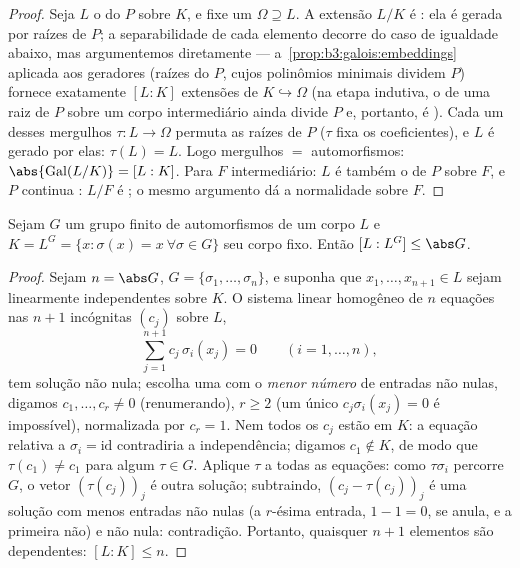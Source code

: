 \begin{proof}
Seja $L$ o  do  $P$
sobre $K$, e fixe um  $\Omega \supseteq L$. A extensão $L/K$ é
: ela é gerada por raízes de $P$; a separabilidade de cada
elemento decorre do caso de igualdade abaixo, mas argumentemos
diretamente --- a~\cref{prop:b3:galois:embeddings} aplicada aos geradores (raízes do
 $P$, cujos polinômios minimais dividem $P$)
fornece exatamente $[L:K]$ extensões de $K \hookrightarrow \Omega$ (na etapa indutiva, o
 de uma raiz de $P$ sobre um corpo intermediário
ainda divide $P$ e, portanto, é ). Cada um desses
mergulhos $\tau \colon L \to \Omega$ permuta as raízes de $P$ ($\tau$ fixa os
coeficientes), e $L$ é gerado por elas: $\tau(L) = L$. Logo mergulhos
$=$ automorfismos: $\abs{\operatorname{Gal}(L/K)} = [L:K]$. Para $F$ intermediário: $L$ é
também o  de $P$ sobre $F$, e $P$
continua : $L/F$ é ; o mesmo argumento dá a
normalidade sobre $F$.
\end{proof}

\begin{lemma}[Artin]\label{lem:b3:galois:artin}
Sejam $G$ um grupo finito de automorfismos de um corpo $L$ e
$K = L^G = \{x : \sigma(x) = x\ \forall\sigma \in G\}$ seu corpo fixo. Então $[L : L^G] \leq \abs G$.
\end{lemma}

\begin{proof}
Sejam $n = \abs G$, $G = \{\sigma_1, \dots, \sigma_n\}$, e suponha que $x_1, \dots, x_{n+1} \in L$ sejam linearmente
independentes sobre $K$. O sistema linear homogêneo de $n$
equações nas $n+1$ incógnitas $(c_j)$ sobre $L$,
\[
\sum_{j=1}^{n+1} c_j\,\sigma_i(x_j) = 0
\qquad (i = 1, \dots, n),
\]
tem solução não nula; escolha uma com o \emph{menor número} de entradas
não nulas, digamos $c_1, \dots, c_r \neq 0$ (renumerando), $r \geq 2$ (um único $c_j\sigma_i(x_j) = 0$ é
impossível), normalizada por $c_r = 1$. Nem todos os $c_j$ estão em
$K$: a equação relativa a $\sigma_i =
\mathrm{id}$ contradiria a independência;
digamos $c_1 \notin K$, de modo que $\tau(c_1) \ne c_1$ para algum $\tau \in G$. Aplique $\tau$ a
todas as equações: como $\tau\sigma_i$ percorre $G$, o vetor $(\tau(c_j))_j$ é outra
solução; subtraindo, $(c_j -
\tau(c_j))_j$ é uma solução com menos entradas não nulas
(a $r$-ésima entrada, $1 - 1 = 0$, se anula, e a primeira não) e não
nula: contradição. Portanto, quaisquer $n+1$ elementos são
dependentes: $[L:K]
\leq n$.
\end{proof}

